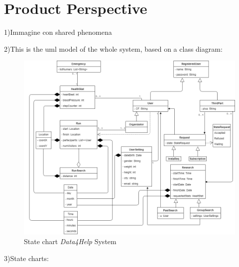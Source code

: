 \section{Product Perspective}
1)Immagine con shared phenomena

2)This is the uml model of  the whole system, based on a class diagram:
\begin{figure}[H]
    \centering
    \includegraphics[scale=0.4]{Pictures/UML.png}
    \caption{State chart  \emph{Data4Help} System}
\end{figure}
3)State charts:

